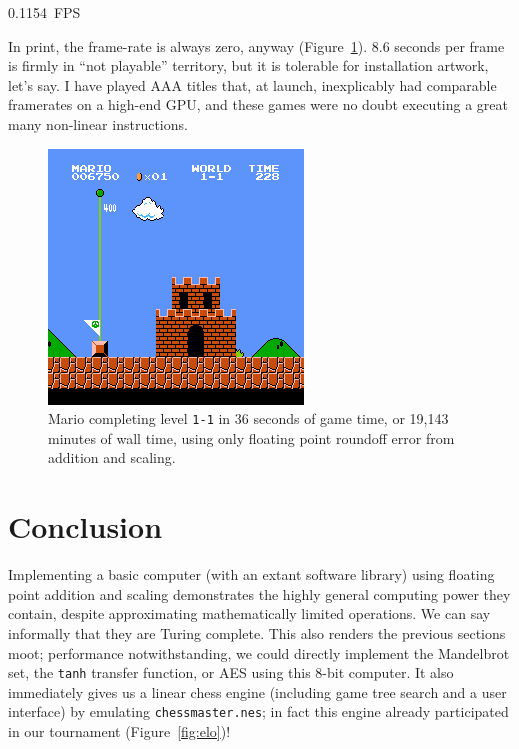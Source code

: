 \documentclass[twocolumn]{article}
\begin{document}
\begin{center}
{\large 0.1154~FPS}
\end{center}

In print, the frame-rate is always zero, anyway
(Figure~\ref{fig:mario}). 8.6 seconds per frame is firmly in ``not
playable'' territory, but it is tolerable for installation artwork,
let's say. I have played AAA titles that, at launch, inexplicably had
comparable framerates on a high-end GPU, and these games were no doubt
executing a great many non-linear instructions.

\begin{figure}[tp]
  \begin{center}
    \includegraphics[width=0.9 \linewidth]{mario-1800}
  \end{center}
  \caption{
    Mario completing level {\tt 1-1} in 36 seconds of game time,
    or 19,143 minutes of wall time, using only floating point roundoff
    error from addition and scaling.
  } \label{fig:mario}
\end{figure}

\section{Conclusion}

Implementing a basic computer (with an extant software library) using
floating point addition and scaling demonstrates the highly general
computing power they contain, despite approximating mathematically
limited operations. We can say informally that they are Turing
complete. This also renders the previous sections moot; performance
notwithstanding, we could directly implement the Mandelbrot set, the
{\tt tanh} transfer function, or AES using this 8-bit computer. It
also immediately gives us a linear chess engine (including game tree
search and a user interface) by emulating {\tt chessmaster.nes}; in
fact this engine already participated in our tournament
(Figure~\ref{fig:elo})!
\end{document}

